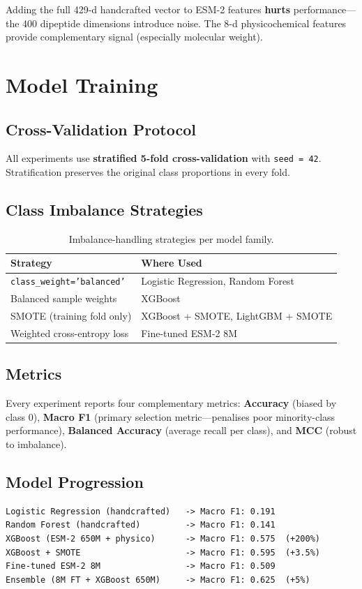 \documentclass[11pt,a4paper]{article}
\begin{document}
Adding the full 429-d handcrafted vector to ESM-2 features \textbf{hurts} performance---the
400 dipeptide dimensions introduce noise.
The 8-d physicochemical features provide complementary signal (especially molecular weight).

\section{Model Training}
\subsection{Cross-Validation Protocol}
All experiments use \textbf{stratified 5-fold cross-validation} with \texttt{seed = 42}.
Stratification preserves the original class proportions in every fold.

\subsection{Class Imbalance Strategies}
\begin{table}[H]
\centering
\caption{Imbalance-handling strategies per model family.}
\begin{tabular}{ll}
\toprule
Strategy & Where Used \\
\midrule
\texttt{class\_weight='balanced'} & Logistic Regression, Random Forest \\
Balanced sample weights & XGBoost \\
SMOTE (training fold only) & XGBoost + SMOTE, LightGBM + SMOTE \\
Weighted cross-entropy loss & Fine-tuned ESM-2 8M \\
\bottomrule
\end{tabular}
\end{table}

\subsection{Metrics}
Every experiment reports four complementary metrics: \textbf{Accuracy} (biased by class 0),
\textbf{Macro F1} (primary selection metric---penalises poor minority-class performance),
\textbf{Balanced Accuracy} (average recall per class), and \textbf{MCC} (robust to imbalance).

\subsection{Model Progression}
\begin{verbatim}
Logistic Regression (handcrafted)   -> Macro F1: 0.191
Random Forest (handcrafted)         -> Macro F1: 0.141
XGBoost (ESM-2 650M + physico)      -> Macro F1: 0.575  (+200%)
XGBoost + SMOTE                     -> Macro F1: 0.595  (+3.5%)
Fine-tuned ESM-2 8M                 -> Macro F1: 0.509
Ensemble (8M FT + XGBoost 650M)     -> Macro F1: 0.625  (+5%)
\end{verbatim}
\end{document}

